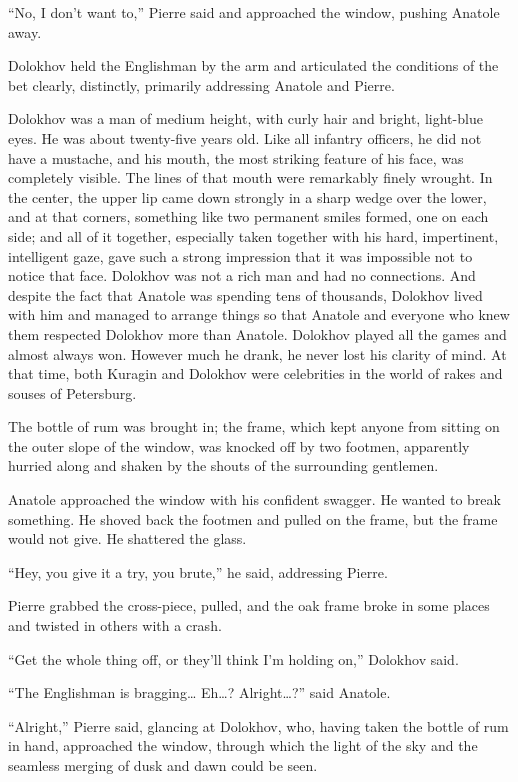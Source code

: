 ``No, I don't want to,'' Pierre said and approached the window, pushing Anatole away. %

Dolokhov held the Englishman by the arm and articulated the conditions of the bet clearly, distinctly, primarily addressing Anatole and Pierre.

Dolokhov was a man of medium height, with curly hair and bright, light-blue eyes. He was about twenty-five years old. Like all infantry officers, he did not have a mustache, and his mouth, the most striking feature of his face, was completely visible. The lines of that mouth were remarkably finely wrought. In the center, the upper lip came down strongly in a sharp wedge over the lower, and at that corners, something like two permanent smiles formed, one on each side; and all of it together, especially taken together with his hard, impertinent, intelligent gaze, gave such a strong impression that it was impossible not to notice that face. Dolokhov was not a rich man and had no connections. And despite the fact that Anatole was spending tens of thousands, Dolokhov lived with him and managed to arrange things so that Anatole and everyone who knew them respected Dolokhov more than Anatole. Dolokhov played all the games and almost always won. However much he drank, he never lost his clarity of mind. At that time, both Kuragin and Dolokhov were celebrities in the world of rakes and souses of Petersburg.

The bottle of rum was brought in; the frame, which kept anyone from sitting on the outer slope of the window, was knocked off by two footmen, apparently hurried along and shaken by the shouts of the surrounding gentlemen.

Anatole approached the window with his confident swagger. He wanted to break something. He shoved back the footmen and pulled on the frame, but the frame would not give. He shattered the glass.

``Hey, you give it a try, you brute,'' he said, addressing Pierre. %

Pierre grabbed the cross-piece, pulled, and the oak frame broke in some places and twisted in others with a crash.

``Get the whole thing off, or they'll think I'm holding on,'' Dolokhov said. %

``The Englishman is bragging\ldots{} Eh\ldots{}? Alright\ldots{}?'' said Anatole. %

``Alright,'' Pierre said, glancing at Dolokhov, who, having taken the bottle of rum in hand, approached the window, through which the light of the sky and the seamless merging of dusk and dawn could be seen. %


